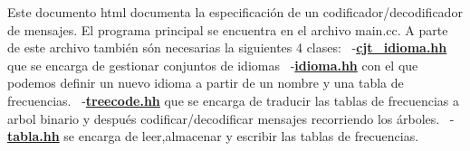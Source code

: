 Este documento html documenta la especificación de un codificador/decodificador de mensajes. El programa principal se encuentra en el archivo main.\+cc. A parte de este archivo también són necesarias la siguientes 4 clases\+:~\newline
 -\/{\bfseries \hyperlink{cjt__idioma_8hh}{cjt\+\_\+idioma.\+hh}} que se encarga de gestionar conjuntos de idiomas~\newline
 -\/{\bfseries \hyperlink{idioma_8hh}{idioma.\+hh}} con el que podemos definir un nuevo idioma a partir de un nombre y una tabla de frecuencias.~\newline
 -\/{\bfseries \hyperlink{treecode_8hh}{treecode.\+hh}} que se encarga de traducir las tablas de frecuencias a arbol binario y después codificar/decodificar mensajes recorriendo los árboles.~\newline
 -\/{\bfseries \hyperlink{tabla_8hh}{tabla.\+hh}} se encarga de leer,almacenar y escribir las tablas de frecuencias.~\newline
 